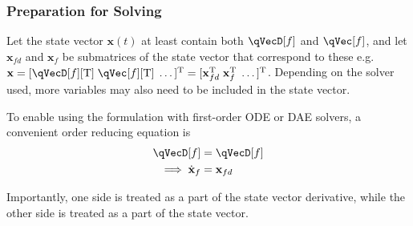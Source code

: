 \documentclass[11pt]{article}
\begin{document}
\subsubsection{Preparation for Solving} \label{sssec:d:fwdDyn:preSolve}
Let the state vector $\mathbf{x}(t)$ at least contain both $\qVecD[f]$ and $\qVec[f]$, and let $\mathbf{x}_{fd}$ and $\mathbf{x}_{f}$ be submatrices of the state vector that correspond to these e.g. $\mathbf{x} = [\qVecD[f][\mathrm{T}] \; \qVec[f][\mathrm{T}] \; \dots]^{\mathrm{T}}=[\mathbf{x}_{fd}^\mathrm{T} \; \mathbf{x}_{f}^\mathrm{T} \; \dots]^{\mathrm{T}}$. Depending on the solver used, more variables may also need to be included in the state vector.

To enable using the formulation with first-order ODE or DAE solvers, a convenient order reducing equation is
\begin{align} \label{eq:order-reducing}
    \qVecD[f] &= \qVecD[f] \nonumber\\
    \implies \dot{\mathbf{x}}_{f} &= \mathbf{x}_{fd}
\end{align}

Importantly, one side is treated as a part of the state vector derivative, while the other side is treated as a part of the state vector.
\end{document}
